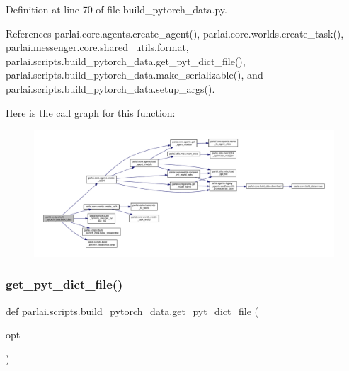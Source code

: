Definition at line 70 of file build\+\_\+pytorch\+\_\+data.\+py.



References parlai.\+core.\+agents.\+create\+\_\+agent(), parlai.\+core.\+worlds.\+create\+\_\+task(), parlai.\+messenger.\+core.\+shared\+\_\+utils.\+format, parlai.\+scripts.\+build\+\_\+pytorch\+\_\+data.\+get\+\_\+pyt\+\_\+dict\+\_\+file(), parlai.\+scripts.\+build\+\_\+pytorch\+\_\+data.\+make\+\_\+serializable(), and parlai.\+scripts.\+build\+\_\+pytorch\+\_\+data.\+setup\+\_\+args().

Here is the call graph for this function\+:
\nopagebreak
\begin{figure}[H]
\begin{center}
\leavevmode
\includegraphics[width=350pt]{namespaceparlai_1_1scripts_1_1build__pytorch__data_a50d93b1dec37499085b9eafc6e425a1a_cgraph}
\end{center}
\end{figure}
\mbox{\label{namespaceparlai_1_1scripts_1_1build__pytorch__data_a6ec85a5842150af78f5178d75075b0cc}} 
\subsubsection{\texorpdfstring{get\+\_\+pyt\+\_\+dict\+\_\+file()}{get\_pyt\_dict\_file()}}
{\footnotesize\ttfamily def parlai.\+scripts.\+build\+\_\+pytorch\+\_\+data.\+get\+\_\+pyt\+\_\+dict\+\_\+file (\begin{DoxyParamCaption}\item[{}]{opt }\end{DoxyParamCaption})}



